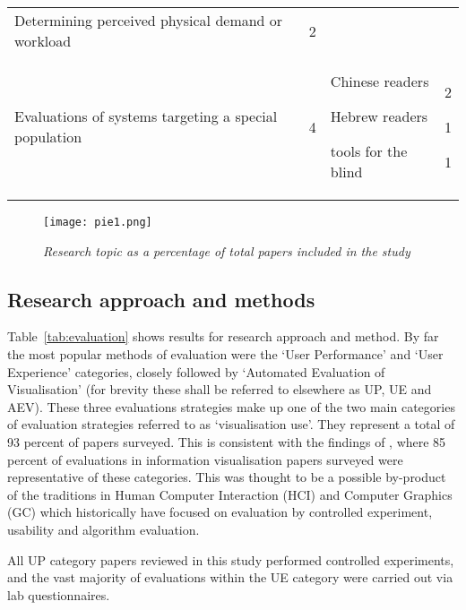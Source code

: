 \begin{landscape}
\begin{table}
\begin{tabular}{|l|c|p{6cm}|x{2cm}|}
Determining perceived physical demand or workload&2&&\\
Evaluations of systems targeting a special population&4&\par Chinese readers\par Hebrew readers\par tools for the blind&2 \par 1\par 1\par\\
\hline\end{tabular}
\label{tab:researchtopic}
\end{table}
\end{landscape}

\begin{figure}[!htb]
\texttt{[image: pie1.png]}
\caption{\textit{Research topic as a percentage of total papers included in the study}}
\label{fig:pie1}
\end{figure}

\subsection{Research approach and methods}

Table~\vref{tab:evaluation} shows results for research approach and method. By far the most popular methods of evaluation were the `User Performance' and `User Experience' categories, closely followed by `Automated Evaluation of Visualisation' (for brevity these shall be referred to elsewhere as UP, UE and AEV). These three evaluations strategies make up one of the two main categories of evaluation strategies referred to as `visualisation use'. They represent a total of 93 percent of papers surveyed. This is consistent with the findings of \citet{lam12}, where 85 percent of evaluations in information visualisation papers surveyed were representative of these categories. This was thought to be a possible by-product of the traditions in Human Computer Interaction (HCI) and Computer Graphics (GC) which historically have focused on evaluation by controlled experiment, usability and algorithm evaluation. 

All UP category papers reviewed in this study performed controlled experiments, and the vast majority of evaluations within the UE category were carried out via lab questionnaires. 

